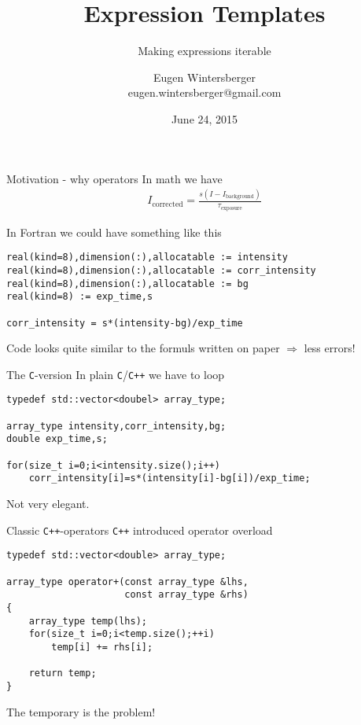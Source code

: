 \documentclass{beamer}
\title{{\Huge Expression Templates}}
\subtitle{Making expressions iterable}
\author{Eugen Wintersberger\\ \small{eugen.wintersberger@gmail.com}}
\date{June 24, 2015}
\begin{document}
\frame{\titlepage}

\begin{frame}[fragile]{Motivation - why operators}
    In math we have 
    \begin{align}
        I_{\mathrm{corrected}}=\frac{s\left(I-I_{\mathrm{background}}\right)}
                                   {\tau_{\mathrm{exposure}}}
                                   \nonumber
    \end{align}

    \vspace{0.05\textheight}
    In Fortran we could have something like this
    \begin{verbatim}
real(kind=8),dimension(:),allocatable := intensity
real(kind=8),dimension(:),allocatable := corr_intensity
real(kind=8),dimension(:),allocatable := bg
real(kind=8) := exp_time,s

corr_intensity = s*(intensity-bg)/exp_time
    \end{verbatim}
   
    \vspace{0.05\textheight}
    Code looks quite similar to the formuls written on paper $\Rightarrow$
    less errors!
\end{frame}

\begin{frame}[fragile]{The \texttt{C}-version}
In plain \texttt{C}/\texttt{C++} we have to loop

\vspace{0.05\textheight}
\begin{verbatim}
typedef std::vector<doubel> array_type;

array_type intensity,corr_intensity,bg;
double exp_time,s;

for(size_t i=0;i<intensity.size();i++)
    corr_intensity[i]=s*(intensity[i]-bg[i])/exp_time;
\end{verbatim}

\vspace{0.05\textheight}
Not very elegant.
\end{frame}

\begin{frame}[fragile]{Classic \texttt{C++}-operators}
    \texttt{C++} introduced operator overload
    \begin{verbatim}
typedef std::vector<double> array_type;

array_type operator+(const array_type &lhs,
                     const array_type &rhs)
{
    array_type temp(lhs);
    for(size_t i=0;i<temp.size();++i)
        temp[i] += rhs[i];

    return temp;
}
    \end{verbatim}

    The temporary is the problem!
\end{frame}
\end{document}
